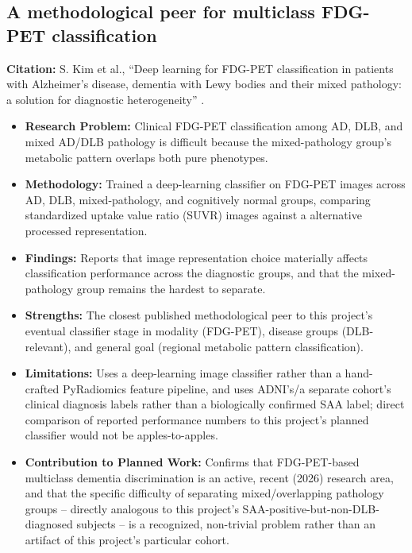 \subsection{A methodological peer for multiclass FDG-PET classification}
\textbf{Citation:} S. Kim et al., ``Deep learning for FDG-PET classification in patients with Alzheimer's disease, dementia with Lewy bodies and their mixed pathology: a solution for diagnostic heterogeneity'' \cite{kim2026dlfdgpet}.

\begin{itemize}
    \item \textbf{Research Problem:} Clinical FDG-PET classification among AD, DLB, and mixed AD/DLB pathology is difficult because the mixed-pathology group's metabolic pattern overlaps both pure phenotypes.
    \item \textbf{Methodology:} Trained a deep-learning classifier on FDG-PET images across AD, DLB, mixed-pathology, and cognitively normal groups, comparing standardized uptake value ratio (SUVR) images against a alternative processed representation.
    \item \textbf{Findings:} Reports that image representation choice materially affects classification performance across the diagnostic groups, and that the mixed-pathology group remains the hardest to separate.
    \item \textbf{Strengths:} The closest published methodological peer to this project's eventual classifier stage in modality (FDG-PET), disease groups (DLB-relevant), and general goal (regional metabolic pattern classification).
    \item \textbf{Limitations:} Uses a deep-learning image classifier rather than a hand-crafted PyRadiomics feature pipeline, and uses ADNI's/a separate cohort's clinical diagnosis labels rather than a biologically confirmed SAA label; direct comparison of reported performance numbers to this project's planned classifier would not be apples-to-apples.
    \item \textbf{Contribution to Planned Work:} Confirms that FDG-PET-based multiclass dementia discrimination is an active, recent (2026) research area, and that the specific difficulty of separating mixed/overlapping pathology groups -- directly analogous to this project's SAA-positive-but-non-DLB-diagnosed subjects -- is a recognized, non-trivial problem rather than an artifact of this project's particular cohort.
\end{itemize}
